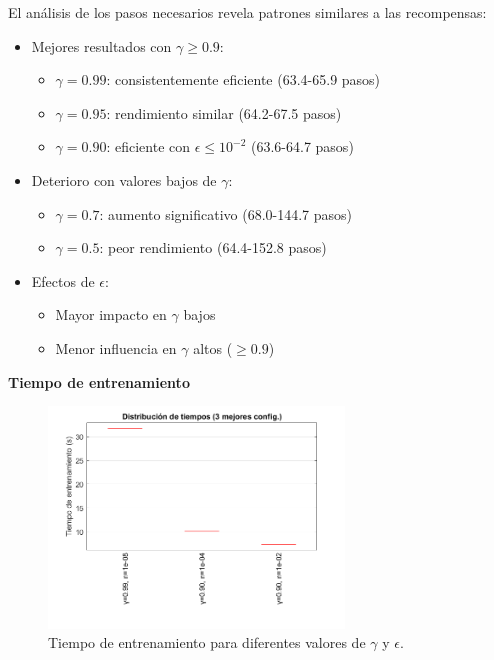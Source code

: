 El análisis de los pasos necesarios revela patrones similares a las recompensas:

\begin{itemize}
    \item Mejores resultados con $\gamma \geq 0.9$:
    \begin{itemize}
        \item $\gamma = 0.99$: consistentemente eficiente (63.4-65.9 pasos)
        \item $\gamma = 0.95$: rendimiento similar (64.2-67.5 pasos)
        \item $\gamma = 0.90$: eficiente con $\epsilon \leq 10^{-2}$ (63.6-64.7 pasos)
    \end{itemize}
    \item Deterioro con valores bajos de $\gamma$:
    \begin{itemize}
        \item $\gamma = 0.7$: aumento significativo (68.0-144.7 pasos)
        \item $\gamma = 0.5$: peor rendimiento (64.4-152.8 pasos)
    \end{itemize}
    \item Efectos de $\epsilon$:
    \begin{itemize}
        \item Mayor impacto en $\gamma$ bajos
        \item Menor influencia en $\gamma$ altos ($\geq 0.9$)
    \end{itemize}
\end{itemize}

\newpage

\textbf{Tiempo de entrenamiento}

\begin{figure}[H]
    \centering
    \includegraphics[width=0.7\textwidth]{../../experiments/valueIteration/experiment-1/results/time.png}
    \caption{Tiempo de entrenamiento para diferentes valores de $\gamma$ y $\epsilon$.}
    \label{fig:trainingTimeValueIteration}
\end{figure}

